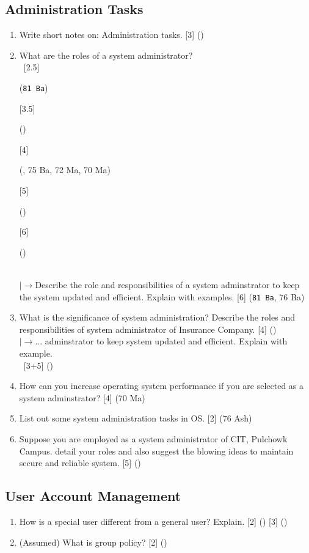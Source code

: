 \documentclass[12pt]{article}
\newcommand{\lb}{\\$\left|\rightarrow\right.$}
\newcommand{\enter}{\\\textcolor{white}{1}}
\begin{document}
	\subsection{Administration Tasks}
		\begin{enumerate}[noitemsep, topsep=0pt]
			\item Write short notes on: Administration tasks. \hfill [3] ()

			\item What are the roles of a system administrator?
			\enter\hfill [2.5] \begin{tiny} (\texttt{81 Ba}) \end{tiny} [3.5] \begin{tiny} () \end{tiny} [4] \begin{tiny} (, 75 Ba, 72 Ma, 70 Ma) \end{tiny} [5] \begin{tiny} () \end{tiny} [6] \begin{tiny} () \end{tiny}
			\lb Describe the role and responsibilities of a system adminstrator to keep the system updated and efficient. Explain with examples. \hfill [6] (\texttt{81 Ba}, 76 Ba)
			
			\item What is the significance of system administration? Describe the roles and responsibilities of system administrator of Insurance Company. \hfill  [4] ()
			\lb ... adminstrator to keep system updated and efficient. Explain with example.
			\enter\hfill [3+5] ()

			\item How can you increase operating system performance if you are selected as a system adminstrator? \hspace{12.6cm} [4] (70 Ma)

			\item List out some system administration tasks in OS. \hfill [2] (76 Ash)

			\item Suppose you are employed as a system administrator of CIT, Pulchowk Campus. detail your roles and also suggest the blowing ideas to maintain secure and reliable system. \hfill [5] ()
		\end{enumerate}

	\subsection{User Account Management}
		\begin{enumerate}[noitemsep, topsep=0pt]
			\item How is a special user different from a general user? Explain. \hfill [2] () [3] ()

			\item (Assumed) What is group policy? \hfill [2] ()
		\end{enumerate}
\end{document}
